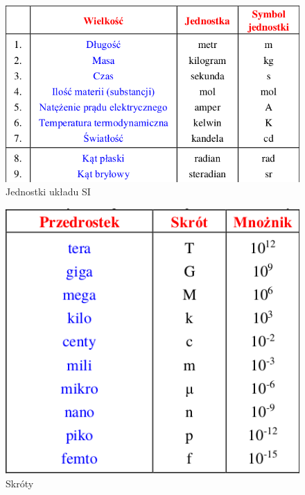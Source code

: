 \documentclass[12pt,twoside,a4paper]{book}
\begin{document}
\begin{center}
\label{Jednostki}
\begin{figure}
\caption{Jednostki układu SI}
\includegraphics[width=\textwidth]{graphics/1}
\end{figure}

\vspace{1cm}
\begin{figure}
\caption{Skróty}
\includegraphics[width=\textwidth]{graphics/2}
\end{figure}


\end{center}
\end{document}
